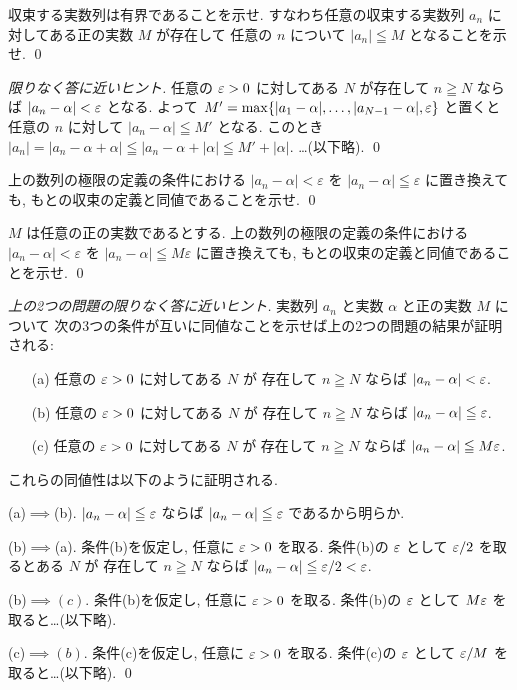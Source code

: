 \documentclass[12pt,twoside]{jarticle}
\begin{document}
\begin{question}
 収束する実数列は有界であることを示せ.
 すなわち任意の収束する実数列 $a_n$ に対してある正の実数 $M$ が存在して
 任意の $n$ について $|a_n|\leqq M$ となることを示せ.
 \qed
\end{question}

\begin{proof}[限りなく答に近いヒント]
 任意の $\varepsilon>0$ に対してある $N$ が存在して $n\geqq N$ 
 ならば $|a_n-\alpha|<\varepsilon$ となる.
 よって $M'=\max\{|a_1-\alpha|,\ldots,|a_{N-1}-\alpha|,\varepsilon\}$ と置くと
 任意の $n$ に対して $|a_n-\alpha|\leqq M'$ となる.
 このとき $|a_n|=|a_n-\alpha+\alpha|\leqq|a_n-\alpha+|\alpha|\leqq M'+|\alpha|$.
 …(以下略).
 \qed
\end{proof}

\begin{question}
\label{q:less->leqq(1)}
  上の数列の極限の定義の条件における $|a_n - \alpha| < \varepsilon$ 
  を $|a_n - \alpha| \leqq \varepsilon$ に置き換えても, 
  もとの収束の定義と同値であることを示せ. \qed
\end{question}

\begin{question}
\label{q:less->leqq(2)}
  $M$ は任意の正の実数であるとする.
  上の数列の極限の定義の条件における $|a_n - \alpha| < \varepsilon$ 
  を $|a_n - \alpha| \leqq M\varepsilon$ に置き換えても, 
  もとの収束の定義と同値であることを示せ. \qed
\end{question}

\begin{proof}[上の2つの問題の限りなく答に近いヒント]
 実数列 $a_n$ と実数 $\alpha$ と正の実数 $M$ について
 次の3つの条件が互いに同値なことを示せば上の2つの問題の結果が証明される:
 \begin{enumerate}
  \item[(a)] 任意の $\varepsilon>0$ に対してある $N$ が
   存在して $n\geqq N$ ならば $|a_n-\alpha| <     \varepsilon$.
  \item[(b)] 任意の $\varepsilon>0$ に対してある $N$ が
   存在して $n\geqq N$ ならば $|a_n-\alpha| \leqq \varepsilon$.
  \item[(c)] 任意の $\varepsilon>0$ に対してある $N$ が
   存在して $n\geqq N$ ならば $|a_n-\alpha| \leqq M\varepsilon$.
 \end{enumerate}
 これらの同値性は以下のように証明される.

 (a)$\implies$(b).
 $|a_n-\alpha|\leqq\varepsilon$ ならば $|a_n-\alpha|\leqq\varepsilon$ であるから明らか.

 (b)$\implies$(a).
 条件(b)を仮定し, 任意に $\varepsilon>0$ を取る.
 条件(b)の $\varepsilon$ として $\varepsilon/2$ を取るとある $N$ が
 存在して $n\geqq N$ ならば $|a_n-\alpha|\leqq\varepsilon/2<\varepsilon$.

 (b)$\implies(c)$.
 条件(b)を仮定し, 任意に $\varepsilon>0$ を取る.
 条件(b)の $\varepsilon$ として $M\varepsilon$ を取ると…(以下略).

 (c)$\implies(b)$.
 条件(c)を仮定し, 任意に $\varepsilon>0$ を取る.
 条件(c)の $\varepsilon$ として $\varepsilon/M$ を取ると…(以下略).
 \qed
\end{proof}
\end{document}
